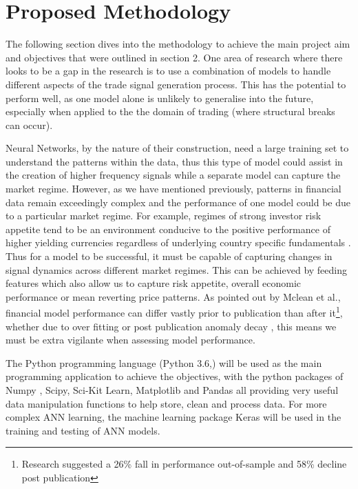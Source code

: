\documentclass[11pt]{article}
\begin{document}
\section{Proposed Methodology}
The following section dives into the methodology to achieve the main project aim and objectives that were outlined in section 2.
One area of research where there looks to be a gap in the research is to use a combination of models to handle different aspects of the trade signal generation process. This has the potential to perform well, as one model alone is unlikely to generalise into the future, especially when applied to the the domain of trading (where structural breaks can occur). \par Neural Networks, by the nature of their construction, need a large training set to understand the patterns within the data, thus this type of model could assist in the creation of higher frequency signals while a separate model can capture the market regime. \newline However, as we have mentioned previously, patterns in financial data remain exceedingly complex and the performance of one model could be due to a particular market regime. For example, regimes of strong investor risk appetite tend to be an environment conducive to the positive performance of higher yielding currencies regardless of underlying country specific fundamentals \cite{Christiansen2011}. \newline Thus for a model to be successful, it must be capable of capturing changes in signal dynamics across different market regimes. This can be achieved by feeding features which also allow us to capture risk appetite, overall economic performance or mean reverting price patterns. 
\newline As pointed out by Mclean et al.\cite{Mclean2016}, financial model performance can differ vastly prior to publication than after it\footnote{Research suggested a 26\% fall in performance out-of-sample and 58\% decline post publication}, whether due to over fitting or post publication anomaly decay \cite{Bartram2019}, this means we must be extra vigilante when assessing model performance.
\par The Python programming language (Python 3.6,\cite{McKinney1976}) will be used as the main programming application to achieve the objectives, with the python packages of Numpy \cite{VanDerWalt2011}, Scipy\cite{Tobergte2013}, Sci-Kit Learn\cite{Geron2017}, Matplotlib\cite{Wood2015} and Pandas\cite{Reiff2002} all providing very useful data manipulation functions to help store, clean and process data. For more complex ANN learning, the machine learning package Keras \cite{Chollet2015} will be used in the training and testing of ANN models.
\end{document}
